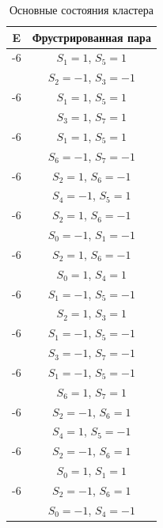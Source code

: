 \documentclass[utf8, babel, sor, jor, amsmath, amssymb, reprint]{elsarticle} %
\begin{document}
\begin{table}[h]
	\centering
	\begin{tabular}{|c|c|}
		\hline
		E   &   Фрустрированная пара \\
		\hline
		-6   &  $S_1=1$, $S_5=1$\\
		      &    $S_2=-1$, $S_3=-1$ \\
		 \hline
		 -6   &  $S_1=1$, $S_5=1$\\
		      &    $S_3=1$, $S_7=1$ \\
		 \hline
		 -6   &  $S_1=1$, $S_5=1$\\
		      &    $S_6=-1$, $S_7=-1$ \\
		 \hline
		-6   &  $S_2=1$, $S_6=-1$\\
				&    $S_4=-1$, $S_5=1$ \\
		 \hline
		-6   &  $S_2=1$, $S_6=-1$\\
				&    $S_0=-1$, $S_1=-1$ \\
		 \hline
		-6   &  $S_2=1$, $S_6=-1$\\
				&    $S_0=1$, $S_4=1$ \\
		\hline
		-6   &  $S_1=-1$, $S_5=-1$\\
			&    $S_2=1$, $S_3=1$ \\
		\hline
		-6   &  $S_1=-1$, $S_5=-1$\\
			&    $S_3=-1$, $S_7=-1$ \\
		\hline
		-6   &  $S_1=-1$, $S_5=-1$\\
			&    $S_6=1$, $S_7=1$ \\
		\hline
		-6   &  $S_2=-1$, $S_6=1$\\
			&    $S_4=1$, $S_5=-1$ \\
		\hline
		-6   &  $S_2=-1$, $S_6=1$\\
			&    $S_0=1$, $S_1=1$ \\
		\hline
		-6   &  $S_2=-1$, $S_6=1$\\
			&    $S_0=-1$, $S_4=-1$ \\
		\hline
	\end{tabular}
	\caption{Основные состояния кластера}
	\label{tab:gs_cl}
\end{table}
\end{document}

